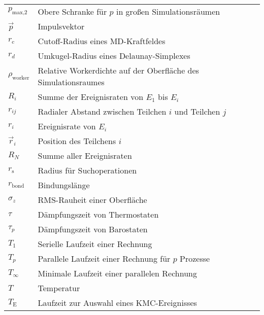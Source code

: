 {\begin{longtable}{ll}
$p_\text{max,2}$     & Obere Schranke für $p$ in großen Simulationsräumen                  \\
$\vec p$             & Impulsvektor                                                        \\
$r_\text{c}$         & Cutoff-Radius eines MD-Kraftfeldes                                  \\
$r_d$                & Umkugel-Radius eines Delaunay-Simplexes                             \\
$\rho_\text{worker}$ & Relative Workerdichte auf der Oberfläche des Simulationsraumes      \\
$R_i$                & Summe der Ereignisraten von $E_1$ bis $E_i$                         \\
$r_{ij}$             & Radialer Abstand zwischen Teilchen $i$ und Teilchen $j$             \\
$r_i$                & Ereignisrate von $E_i$                                              \\
$\vec r_i$           & Position des Teilchens $i$                                          \\
$R_N$                & Summe aller Ereignisraten                                           \\
$r_\text{s}$         & Radius für Suchoperationen                                          \\
$r_\text{bond}$      & Bindungslänge                                                       \\
$\sigma_z$           & RMS-Rauheit einer Oberfläche                                        \\
$\tau$               & Dämpfungszeit von Thermostaten                                      \\
$\tau_p$             & Dämpfungszeit von Barostaten                                        \\
$T_1$                & Serielle Laufzeit einer Rechnung                                    \\
$T_p$                & Parallele Laufzeit einer Rechnung für $p$ Prozesse                  \\
$T_\infty$           & Minimale Laufzeit einer parallelen Rechnung                         \\
$T$                  & Temperatur                                                          \\
$T_\text{E}$         & Laufzeit zur Auswahl eines KMC-Ereignisses                          \\

\end{longtable}}
